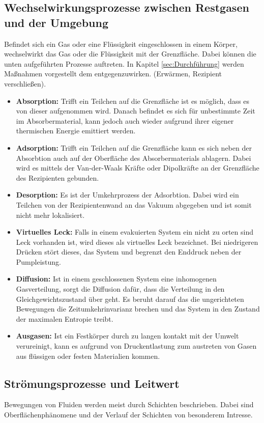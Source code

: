 \subsection{Wechselwirkungsprozesse zwischen Restgasen und der Umgebung}
Befindet sich ein Gas oder eine Flüssigkeit eingeschlossen in einem Körper, wechselwirkt das Gas oder die Flüssigkeit mit der Grenzfläche. Dabei können die unten aufgeführten Prozesse auftreten. In Kapitel \ref{sec:Durchführung} werden Maßnahmen vorgestellt dem entgegenzuwirken. (Erwärmen, Rezipient verschließen).
\begin{itemize}
  \item \textbf{Absorption:} Trifft ein Teilchen auf die Grenzfläche ist es möglich, dass es von dieser aufgenommen wird. Danach befindet es sich für unbestimmte Zeit im Absorbermaterial, kann jedoch auch wieder aufgrund ihrer eigener thermischen Energie emittiert werden.
  \item \textbf{Adsorption:} Trifft ein Teilchen auf die Grenzfläche kann es sich neben der Absorbtion auch auf der Oberfläche des Absorbermaterials ablagern. Dabei wird es mittels der Van-der-Waals Kräfte oder Dipolkräfte an der Grenzfläche des Rezipienten gebunden.
  \item \textbf{Desorption:} Es ist der Umkehrprozess der Adsorbtion. Dabei wird ein Teilchen von der Rezipientenwand an das Vakuum abgegeben und ist somit nicht mehr lokalisiert.
  \item \textbf{Virtuelles Leck:} Falls in einem evakuierten System ein nicht zu orten sind Leck vorhanden ist, wird dieses als virtuelles Leck bezeichnet. Bei niedrigeren Drücken stört dieses, das System und begrenzt den Enddruck neben der Pumpleistung. 
  \item \textbf{Diffusion:} Ist in einem geschlossenen System eine inhomogenen Gasverteilung, sorgt die Diffusion dafür, dass die Verteilung in den Gleichgewichtszustand über geht. Es beruht darauf das die ungerichteten Bewegungen die Zeitumkehrinvarianz brechen und das System in den Zustand der maximalen Entropie treibt.
  \item \textbf{Ausgasen:} Ist ein Festkörper durch zu langen kontakt mit der Umwelt verureinigt, kann es aufgrund von Druckentlastung zum austreten von Gasen aus flüssigen oder festen Materialien kommen.
\end{itemize}
\subsection{Strömungsprozesse und Leitwert}
Bewegungen von Fluiden werden meist durch Schichten beschrieben. Dabei sind Oberflächenphänomene und der Verlauf der Schichten von besonderem Intresse.
